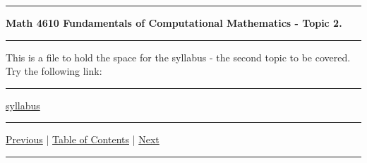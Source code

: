 \documentclass[10pt,fleqn]{article}
\begin{document}
\vskip0.1in\hrule\vskip0.1in
\noindent
{\bf Math 4610 Fundamentals of Computational Mathematics  - Topic 2.} 
\vskip0.1in\hrule\vskip0.1in
\noindent
This is a file to hold the space for the syllabus - the second topic to be
covered. Try the following link:
\vskip0.1in\hrule\vskip0.1in
\href{../pdf/embed_02.md}{syllabus}
\vskip0.1in\hrule\vskip0.1in \noindent
  \href{../../topic_01/md/topic_01.md}{Previous} |
  \href{../../toc/md/topic_toc.md}{Table of Contents} |
  \href{../../topic_03/md/topic_03.md}{Next}
\vskip0.1in\hrule\vskip0.1in \noindent
\end{document}
